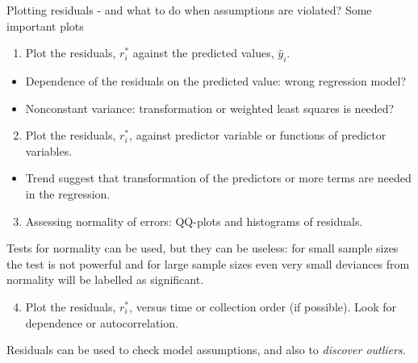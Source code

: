 \documentclass[
  ignorenonframetext,
]{beamer}
\providecommand{\tightlist}{%
  \setlength{\itemsep}{0pt}\setlength{\parskip}{0pt}}
\begin{document}
\begin{frame}
\begin{block}{Plotting residuals - and what to do when assumptions are
violated?}
\protect{}\label{plotting-residuals---and-what-to-do-when-assumptions-are-violated}
Some important plots

\begin{enumerate}
\tightlist
\item
  Plot the residuals, \(r^*_i\) against the predicted values,
  \(\hat{y}_i\).
\end{enumerate}

\begin{itemize}
\item
  Dependence of the residuals on the predicted value: wrong regression
  model?
\item
  Nonconstant variance: transformation or weighted least squares is
  needed?
\end{itemize}

\begin{enumerate}
\setcounter{enumi}{1}
\tightlist
\item
  Plot the residuals, \(r^*_i\), against predictor variable or functions
  of predictor variables.
\end{enumerate}

\begin{itemize}
\tightlist
\item
  Trend suggest that transformation of the predictors or more terms are
  needed in the regression.
\end{itemize}
\end{block}
\end{frame}

\begin{frame}
\begin{enumerate}
\setcounter{enumi}{2}
\tightlist
\item
  Assessing normality of errors: QQ-plots and histograms of residuals.
\end{enumerate}

Tests for normality can be used, but they can be useless: for small
sample sizes the test is not powerful and for large sample sizes even
very small deviances from normality will be labelled as significant.

\begin{enumerate}
\setcounter{enumi}{3}
\tightlist
\item
  Plot the residuals, \(r^*_i\), versus time or collection order (if
  possible). Look for dependence or autocorrelation.
\end{enumerate}

Residuals can be used to check model assumptions, and also to
\emph{discover outliers}.
\end{frame}
\end{document}
